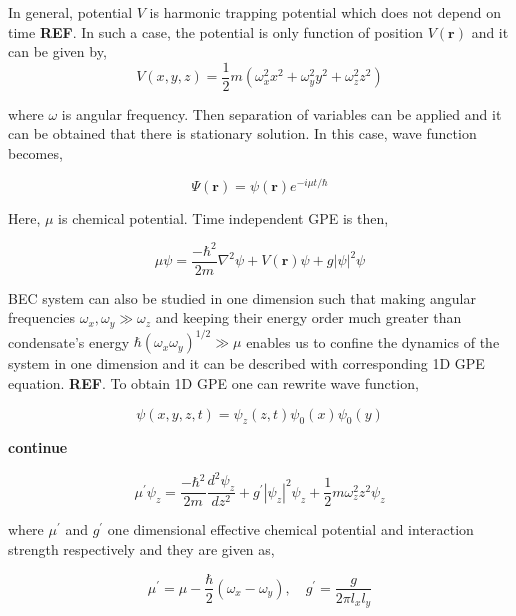 \documentclass[a4paper,times,12pt]{article}
\begin{document}
In general, potential $V$ is harmonic trapping potential which does not depend on time \textbf{REF}. In such a case, the potential is only function of position $V(\boldsymbol{r})$ and it can be given by,
\begin{equation}
\label{eq:GPE_harmonic_potential}
V(x, y, z) = \frac{1}{2}m(\omega_x^2 x^2 + \omega_y^2y^2 + \omega_z^2z^2)
\end{equation}


where $\omega$ is angular frequency. Then separation of variables can be applied and it can be obtained that there is stationary solution. In this case, wave function becomes,

\begin{equation}
\label{eq:GPE_time_indep_wave_func}
\Psi(\boldsymbol{r}) = \psi(\boldsymbol{r})e^{-i\mu t/\hbar}
\end{equation}

Here, $\mu$ is chemical potential. Time independent GPE is then,

\begin{equation}
\label{eq:GPE_time_indep}
\mu\psi = \frac{-\hbar^2}{2m}\nabla^2\psi + V(\boldsymbol{r})\psi + g|\psi|^2\psi 
\end{equation}

BEC system can also be studied in one dimension such that making angular frequencies $\omega_x, \omega_y \gg \omega_z$ and keeping their energy order much greater than condensate's energy $ \hbar(\omega_x \omega_y)^{1/2} \gg \mu $ enables us to confine the dynamics of the system in one dimension and it can be described with corresponding 1D GPE equation. \textbf{REF}. To obtain 1D GPE one can rewrite wave function,

\begin{equation}
\label{eq:GPE_time_indep_wave_func_seperated}
\psi(x, y, z, t) = \psi_z(z, t)\psi_0(x)\psi_0(y)
\end{equation}

\textbf{continue}

\begin{equation}
\label{eq:GPE_1D}
\mu^{\prime}\psi_z = \frac{-\hbar^2}{2m}\frac{d^2\psi_z}{dz^2} + g^{\prime}|\psi_z|^2\psi_z + \frac{1}{2}m\omega_z^2 z^2\psi_z
\end{equation}

where $\mu^{\prime}$ and $g^{\prime}$ one dimensional effective chemical potential and interaction strength respectively and they are given as,

\begin{equation}
\label{eq:GPE_1D_chem_inter}
\mu^{\prime} = \mu - \frac{\hbar}{2}(\omega_x - \omega_y), \quad g^{\prime} = \frac{g}{2\pi l_x l_y}
\end{equation}
\end{document}
